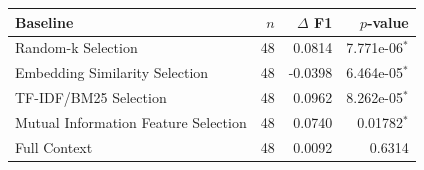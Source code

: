 \begin{tabular}{lrrr}
\toprule
Baseline & $n$ & $\Delta$ F1 & $p$-value \\
\midrule
Random-k Selection & 48 & 0.0814 & 7.771e-06$^*$ \\
Embedding Similarity Selection & 48 & -0.0398 & 6.464e-05$^*$ \\
TF-IDF/BM25 Selection & 48 & 0.0962 & 8.262e-05$^*$ \\
Mutual Information Feature Selection & 48 & 0.0740 & 0.01782$^*$ \\
Full Context & 48 & 0.0092 & 0.6314 \\
\bottomrule
\end{tabular}
